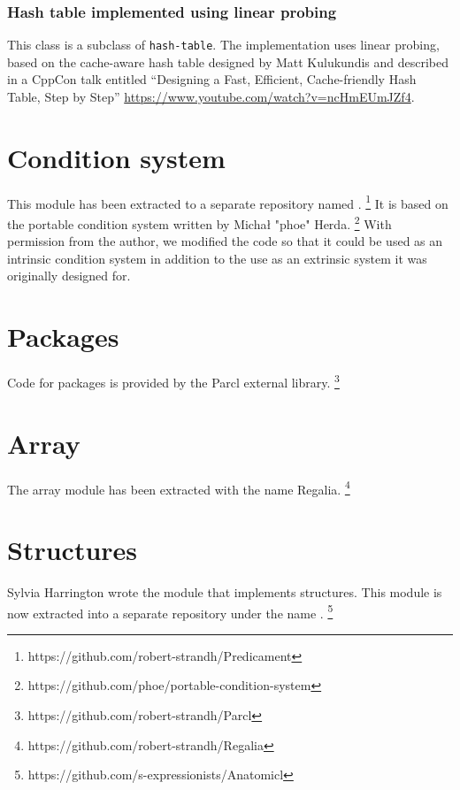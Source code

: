 \subsubsection{Hash table implemented using linear probing}


This class is a subclass of \texttt{hash-table}.  The implementation
uses linear probing, based on the cache-aware hash table designed by
Matt Kulukundis and described in a CppCon talk entitled
``Designing a Fast, Efficient, Cache-friendly Hash Table, Step by Step''
\url{https://www.youtube.com/watch?v=ncHmEUmJZf4}.

\section{Condition system}
\label{sec-condition-system}

This module has been extracted to a separate repository named
\predicament{}.%
\footnote{https://github.com/robert-strandh/Predicament}
It is based on the portable condition system written by Michał "phoe"
Herda.%
\footnote{https://github.com/phoe/portable-condition-system}
With permission from the author, we modified the code so that it could
be used as an intrinsic condition system in addition to the use as an
extrinsic system it was originally designed for.

\section{Packages}
\label{sec-packages}

Code for packages is provided by the Parcl external library.%
\footnote{https://github.com/robert-strandh/Parcl}

\section{Array}
\label{sec-array}

The array module has been extracted with the name Regalia.%
\footnote{https://github.com/robert-strandh/Regalia}

\section{Structures}
\label{sec-structures}

Sylvia Harrington wrote the \sysname{} module that implements
structures.  This module is now extracted into a separate repository
under the name \anatomicl{}.%
\footnote{https://github.com/s-expressionists/Anatomicl}

